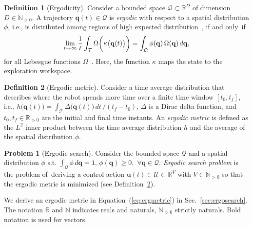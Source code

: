 \documentclass[letterpaper,10pt,conference,twoside]{IEEEtran}
\theoremstyle{definition}
\newtheorem{defn}{Definition}[section]
\newtheorem{pb}{Problem}[section]
\begin{document}
\begin{defn}[Ergodicity]
  Consider a bounded space $\mathcal{Q}\subset\mathbb{R}^D$ of dimension $D\in\mathbb{N}_{>0}$. 
  A trajectory $\mathbf{q}(t)\in\mathcal{Q}$ is \textit{ergodic} with respect to a spatial distribution $\phi$, i.e., is distributed among regions of high expected distribution~\cite{miller2016ergodic}, if and only~if
  \begin{equation}
    \lim_{t\rightarrow \infty}{\small
      \frac{1}{t}\int_{\mathcal{T}}\Omega\bigg(\kappa\big(\mathbf{q}(t)\big)\bigg)=\int_{\mathcal{Q}}\phi(\mathbf{q})\,\Omega(\mathbf{q})\,d\mathbf{q},
    }
  \end{equation}
  for all Lebesgue functions $\Omega$~\cite{mathew2011metrics}. Here, the function $\kappa$ maps the state to the exploration workspace.%
  \end{defn}

\begin{defn}[Ergodic metric]\label{def:ergom}
  Consider a time average distribution that describes where the robot spends more time over a finite time window $[t_0,t_f]$, i.e., $h\big(\mathbf{q}(t)\big)=\int_{\mathcal{T}}{\Delta\big(\mathbf{q}(t)\big)}\,dt\,/(t_f-t_0)$, $\Delta$ is a Dirac delta function, and $t_0,t_f\in\mathbb{R}_{>0}$ are the initial and final time instants. 
  An \textit{ergodic metric} is defined as the $L^2$ inner product between the time average distribution $h$ and the average of the spatial distribution $\phi$.
\end{defn}

\begin{pb}[Ergodic search]\label{pb:ergo}
  Consider the bounded space $\mathcal{Q}$ and a spatial distribution $\phi$ s.t. $\int_{\mathcal{Q}}\phi\,d\mathbf{q}=1,\,\phi(\mathbf{q})\geq 0,\,\, \forall \mathbf{q}\in\mathcal{Q}$.
  \textit{Ergodic search problem} is the problem of~deriving a control action $\mathbf{u}(t)\in\mathcal{U}\subset\mathbb{R}^V$ with $V\in\mathbb{N}_{>0}$ so that the ergodic metric is minimized (see Definition~\ref{def:ergom}). %
\end{pb}

We derive an ergodic metric in Equation~(\ref{eq:ergmetric}) in Sec.~\ref{sec:ergosearch}. 
%
The notation $\mathbb{R}$ and $\mathbb{N}$ indicates reals and naturals, $\mathbb{N}_{>0}$ strictly naturals. Bold notation is used for vectors.
%
\end{document}
